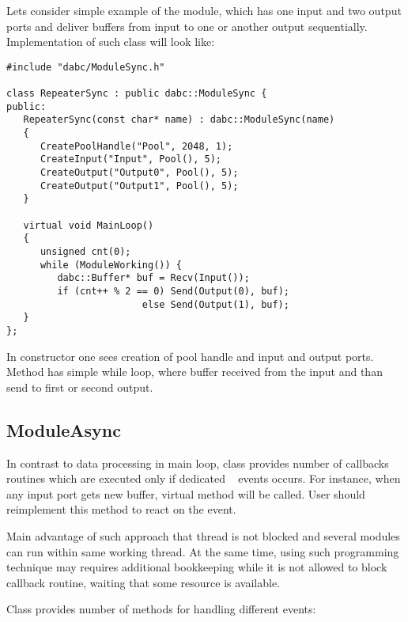 Lets consider simple example of the module, 
which has one input and two output ports and deliver buffers from input to
one or another output sequentially. Implementation of such 
class will look like:
\begin{small}
\begin{verbatim}
#include "dabc/ModuleSync.h"

class RepeaterSync : public dabc::ModuleSync {
public:
   RepeaterSync(const char* name) : dabc::ModuleSync(name)
   {
      CreatePoolHandle("Pool", 2048, 1);
      CreateInput("Input", Pool(), 5);
      CreateOutput("Output0", Pool(), 5);
      CreateOutput("Output1", Pool(), 5);
   }
     
   virtual void MainLoop()
   {
      unsigned cnt(0);
      while (ModuleWorking()) {
         dabc::Buffer* buf = Recv(Input());
         if (cnt++ % 2 == 0) Send(Output(0), buf);
                        else Send(Output(1), buf);
   }
};
\end{verbatim}
\end{small}

In constructor one sees creation of pool handle and input and output ports.
Method  has simple while loop, where buffer received from the
input and than send to first or second output.

  
\subsection{ModuleAsync}
\label{plugin_module_async}

In contrast to data processing in  main loop,
class  provides 
number of callbacks routines which are executed only if dedicated \dabc~ events occurs.
For instance, when any input port gets new buffer, virtual method  will
be called. User should reimplement this method to react on the event.

Main advantage of such approach that thread is not blocked and
several modules  can run within same working thread.
At the same time, using such programming technique may requires additional 
bookkeeping while it is not allowed to block callback routine, waiting that
some resource is available.

Class  provides number of methods for handling different events:

